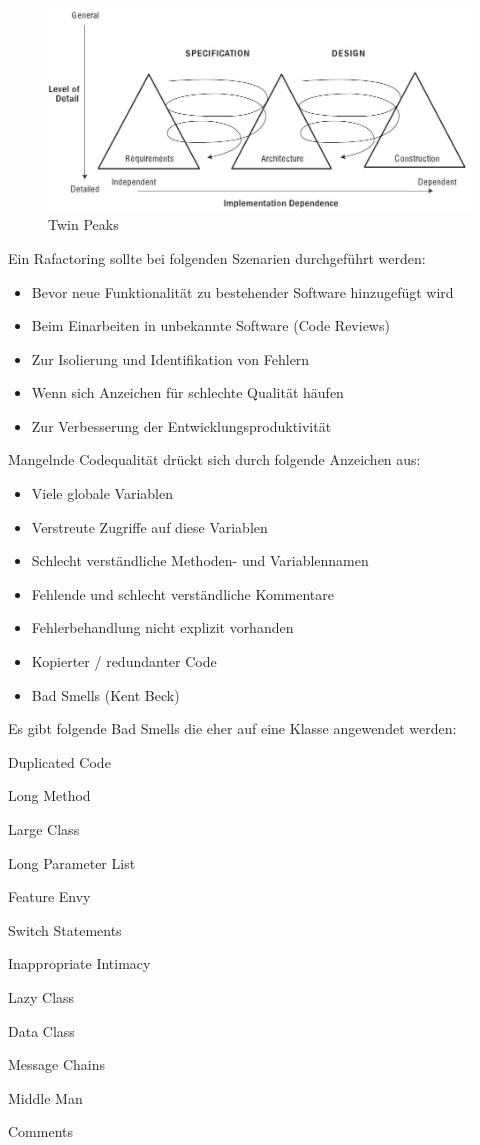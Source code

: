 \begin{figure}
\centering
\includegraphics[width=0.7\linewidth]{fig/twin-peaks}
\caption{Twin Peaks}
\label{fig:twin-peaks-1}
\end{figure}

Ein Rafactoring sollte bei folgenden Szenarien durchgeführt werden:
\begin{itemize}
	\item Bevor neue Funktionalität zu bestehender Software hinzugefügt wird
	\item Beim Einarbeiten in unbekannte Software (Code Reviews)
	\item Zur Isolierung und Identifikation von Fehlern
	\item Wenn sich Anzeichen für schlechte Qualität häufen
	\item Zur Verbesserung der Entwicklungsproduktivität
\end{itemize}
Mangelnde Codequalität drückt sich durch folgende Anzeichen aus:
\begin{itemize}
	\item Viele globale Variablen
	\item Verstreute Zugriffe auf diese Variablen
	\item Schlecht verständliche Methoden- und Variablennamen
	\item Fehlende und schlecht verständliche Kommentare
	\item Fehlerbehandlung nicht explizit vorhanden
	\item Kopierter / redundanter Code
	\item Bad Smells (Kent Beck)
\end{itemize}
Es gibt folgende Bad Smells die eher auf eine Klasse angewendet werden:
\begin{description}
	\item Duplicated Code
	\item Long Method
	\item Large Class
	\item Long Parameter List
	\item Feature Envy
	\item Switch Statements
	\item Inappropriate Intimacy
	\item Lazy Class
	\item Data Class
	\item Message Chains
	\item Middle Man
	\item Comments
\end{description}
